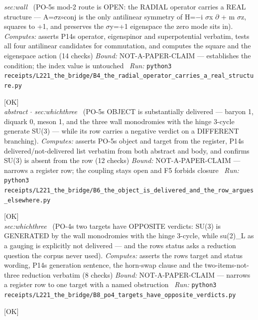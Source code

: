 \begin{description}
\textit{sec:wall} \ (PO-5s mod-2 route is OPEN: the RADIAL operator carries a REAL structure --- A=\ensuremath{\sigma}z\ensuremath{\circ}conj is the only antilinear symmetry of H=\ensuremath{-}i \ensuremath{\sigma}x \ensuremath{\partial} + m \ensuremath{\sigma}z, squares to +1, and preserves the \ensuremath{\sigma}y=+1 eigenspace the zero mode sits in). 
\emph{Computes:} asserts P14s operator, eigenspinor and superpotential verbatim, tests all four antilinear candidates for commutation, and computes the square and the eigenspace action (14 checks)
 \emph{Bound:} NOT-A-PAPER-CLAIM --- establishes the condition; the index value is untouched
\ \emph{Run:} \texttt{python3 receipts/L221\_the\_bridge/B4\_the\_radial\_operator\_carries\_a\_real\_structure.py}
\item[\label{rcpt:B6_the_object_is_delivered_and_the_row_argues_elsewhere}\textbf{}\quad\texttt{B6\_the\_object\_is\_delivered\_and\_the\_row\_argues\_elsewhere}]\hfill\textsf{[OK]}\\
\textit{abstract \ensuremath{\cdot} sec:whichthree} \ (PO-5s OBJECT is substantially delivered --- baryon 1, diquark 0, meson 1, and the three wall monodromies with the hinge 3-cycle generate SU(3) --- while its row carries a negative verdict on a DIFFERENT branching). 
\emph{Computes:} asserts PO-5s object and target from the register, P14s delivered/not-delivered list verbatim from both abstract and body, and confirms SU(3) is absent from the row (12 checks)
 \emph{Bound:} NOT-A-PAPER-CLAIM --- narrows a register row; the coupling stays open and F5 forbids closure
\ \emph{Run:} \texttt{python3 receipts/L221\_the\_bridge/B6\_the\_object\_is\_delivered\_and\_the\_row\_argues\_elsewhere.py}
\item[\label{rcpt:B8_po4_targets_have_opposite_verdicts}\textbf{}\quad\texttt{B8\_po4\_targets\_have\_opposite\_verdicts}]\hfill\textsf{[OK]}\\
\textit{sec:whichthree} \ (PO-4s two targets have OPPOSITE verdicts: SU(3) is GENERATED by the wall monodromies with the hinge 3-cycle, while su(2)\_L as a gauging is explicitly not delivered --- and the rows status asks a reduction question the corpus never used). 
\emph{Computes:} asserts the rows target and status wording, P14s generation sentence, the horn-swap clause and the two-items-not-three reduction verbatim (8 checks)
 \emph{Bound:} NOT-A-PAPER-CLAIM --- narrows a register row to one target with a named obstruction
\ \emph{Run:} \texttt{python3 receipts/L221\_the\_bridge/B8\_po4\_targets\_have\_opposite\_verdicts.py}
\item[\label{rcpt:B9_po3_why_is_answered_dimensionally}\textbf{}\quad\texttt{B9\_po3\_why\_is\_answered\_dimensionally}]\hfill\textsf{[OK]}\\

\end{description}
